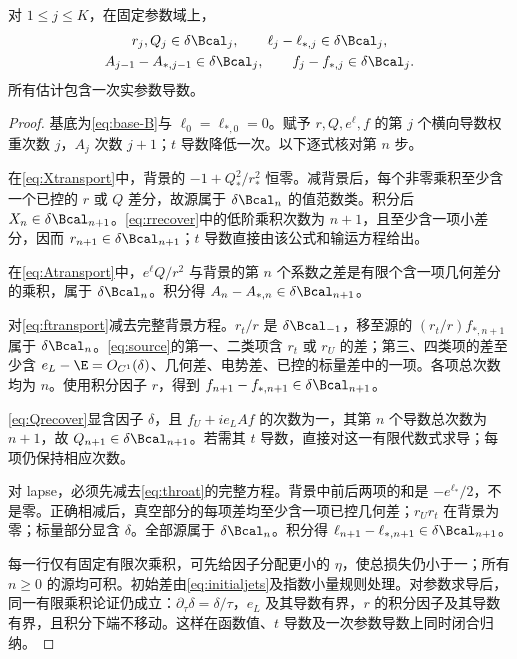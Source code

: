 \begin{lemma}[参数一致的有限阶差分估计]\label{lem:jetdifference}
对 $1\le j\le K$，在固定参数域上，
\begin{equation}\label{eq:jetdifference}
\begin{gathered}
r_j,Q_j\in\delta\Bcal_j,\qquad
\ell_j-\ell_{*,j}\in\delta\Bcal_j,\\
A_{j-1}-A_{*,j-1}\in\delta\Bcal_j,\qquad
f_j-f_{*,j}\in\delta\Bcal_j.
\end{gathered}
\end{equation}
所有估计包含一次实参数导数。
\end{lemma}
\begin{proof}
基底为\eqref{eq:base-B}与 $\ell_0=\ell_{*,0}=0$。赋予 $r,Q,e^\ell,f$ 的第 $j$ 个横向导数权重次数 $j$，$A_j$ 次数 $j+1$；$t$ 导数降低一次。以下逐式核对第 $n$ 步。

在\eqref{eq:Xtransport}中，背景的 $-1+Q_*^2/r_*^2$ 恒零。减背景后，每个非零乘积至少含一个已控的 $r$ 或 $Q$ 差分，故源属于 $\delta\Bcal_n$ 的值范数类。积分后 $X_n\in\delta\Bcal_{n+1}$。\eqref{eq:rrecover}中的低阶乘积次数为 $n+1$，且至少含一项小差分，因而 $r_{n+1}\in\delta\Bcal_{n+1}$；$t$ 导数直接由该公式和输运方程给出。

在\eqref{eq:Atransport}中，$e^\ell Q/r^2$ 与背景的第 $n$ 个系数之差是有限个含一项几何差分的乘积，属于 $\delta\Bcal_n$。积分得 $A_n-A_{*,n}\in\delta\Bcal_{n+1}$。

对\eqref{eq:ftransport}减去完整背景方程。$r_t/r$ 是 $\delta\Bcal_{-1}$，移至源的 $(r_t/r)f_{*,n+1}$ 属于 $\delta\Bcal_n$。\eqref{eq:source}的第一、二类项含 $r_t$ 或 $r_U$ 的差；第三、四类项的差至少含 $e_L-\E=O_{C^1}(\delta)$、几何差、电势差、已控的标量差中的一项。各项总次数均为 $n$。使用积分因子 $r$，得到 $f_{n+1}-f_{*,n+1}\in\delta\Bcal_{n+1}$。

\eqref{eq:Qrecover}显含因子 $\delta$，且 $f_U+ie_LAf$ 的次数为一，其第 $n$ 个导数总次数为 $n+1$，故 $Q_{n+1}\in\delta\Bcal_{n+1}$。若需其 $t$ 导数，直接对这一有限代数式求导；每项仍保持相应次数。

对 lapse，必须先减去\eqref{eq:throat}的完整方程。背景中前后两项的和是 $-e^{\ell_*}/2$，不是零。正确相减后，真空部分的每项差均至少含一项已控几何差；$r_Ur_t$ 在背景为零；标量部分显含 $\delta$。全部源属于 $\delta\Bcal_n$。积分得 $\ell_{n+1}-\ell_{*,n+1}\in\delta\Bcal_{n+1}$。

每一行仅有固定有限次乘积，可先给因子分配更小的 $\eta$，使总损失仍小于一；所有 $n\ge0$ 的源均可积。初始差由\eqref{eq:initialjets}及指数小量规则处理。对参数求导后，同一有限乘积论证仍成立：$\partial_\tau\delta=\delta/\tau$，$e_L$ 及其导数有界，$r$ 的积分因子及其导数有界，且积分下端不移动。这样在函数值、$t$ 导数及一次参数导数上同时闭合归纳。
\end{proof}

